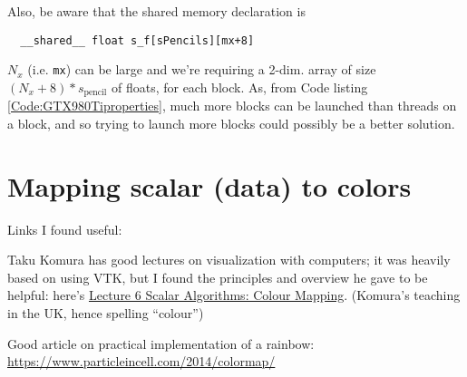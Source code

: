 \documentclass[10pt]{amsart}
\begin{document}
\begin{multicols*}{2}
Also, be aware that the shared memory declaration is
\begin{lstlisting}
  __shared__ float s_f[sPencils][mx+8]
\end{lstlisting}

$N_x$ (i.e. \verb|mx|) can be large and we're requiring a 2-dim. array of size $(N_x+8)*s_{\text{pencil}}$ of floats, for each block.  As, from Code listing \ref{Code:GTX980Tiproperties}, much more blocks can be launched than threads on a block, and so trying to launch more blocks could possibly be a better solution.  



\pagebreak

\section{Mapping scalar (data) to colors}

Links I found useful:

Taku Komura has good lectures on visualization with computers; it was heavily based on using VTK, but I found the principles and overview he gave to be helpful: here's \href{http://www.inf.ed.ac.uk/teaching/courses/vis/lecture_notes/lecture6.pdf}{Lecture 6 Scalar Algorithms: Colour Mapping}.  (Komura's teaching in the UK, hence spelling ``colour'')

Good article on practical implementation of a rainbow: \url{https://www.particleincell.com/2014/colormap/}


\end{multicols*}
\end{document}
